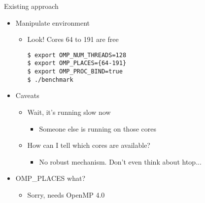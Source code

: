 \documentclass{beamer}
\begin{document}
\begin{frame}[fragile]{Existing approach}
\begin{itemize}
\item Manipulate environment
	\begin{itemize}
	\item Look! Cores 64 to 191 are free
	\begin{verbatim}
$ export OMP_NUM_THREADS=128
$ export OMP_PLACES={64-191}
$ export OMP_PROC_BIND=true
$ ./benchmark
	\end{verbatim}
	\end{itemize}

\vspace{6pt}

\item Caveats
\vspace{4pt}
	\begin{itemize}
	\item Wait, it's running slow now
		\begin{itemize}
		\item Someone else is running on those cores
		\end{itemize}
\vspace{4pt}
	\item How can I tell which cores are available?
		\begin{itemize}
		\item No robust mechanism. Don't even think about htop...
		\end{itemize}
	\end{itemize}
\vspace{4pt}
	\item OMP\_PLACES what?
	\begin{itemize}
	\item Sorry, needs OpenMP 4.0
	\end{itemize}

\end{itemize}
\end{frame}
\end{document}
